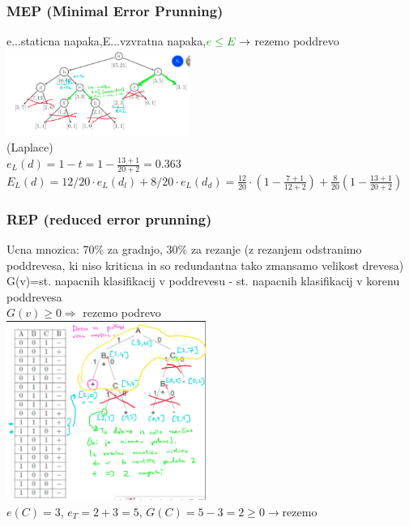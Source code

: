 \subsubsection{MEP (Minimal Error Prunning)}
e...staticna napaka,E...vzvratna napaka,$\green{e\leq E} \rightarrow$ rezemo poddrevo\\
\includegraphics[width=6cm]{./images/mep.png}\\
(Laplace)\\
$e_L(d)=1-t=1-\frac{13+1}{20+2}=0.363$\\
$E_L(d)=12/20\cdot e_L(d_l) + 8/20\cdot e_L(d_d)= \frac{12}{20} \cdot(1-\frac{7+1}{12+2})+\frac{8}{20}(1-\frac{13+1}{20+2})$\\

\subsubsection{REP (reduced error prunning)} 
Ucna mnozica: 70\% za gradnjo, 30\% za rezanje (z rezanjem odstranimo poddrevesa, ki niso kriticna in so redundantna tako zmansamo velikost drevesa)\\
G(v)=st. napacnih klasifikacij v poddrevesu - st. napacnih klasifikacij v korenu poddrevesa\\
$G(v)\geq 0 \Rightarrow$ rezemo podrevo\\
\includegraphics[width=6.5cm]{./images/rep.png}\\
$e(C)=3$,\;\;\; $e_T=2+3=5$,\;\;\; $G(C)=5-3=2\geq0 \rightarrow \text{rezemo}$


